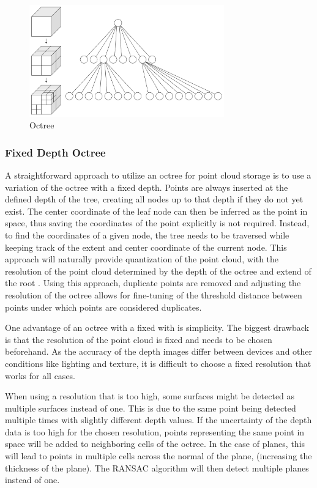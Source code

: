 \begin{figure}[h]
    \centering
    \includegraphics[width=0.75\textwidth]{images/octree}
    \caption{Octree}
    \label{fig:octrree}
\end{figure}

\subsubsection{Fixed Depth Octree}
A straightforward approach to utilize an octree for point cloud storage is to use a variation of the octree with a fixed depth.
Points are always inserted at the defined depth of the tree, creating all nodes up to that depth if they do not yet exist.
The center coordinate of the leaf node can then be inferred as the point in space,
thus saving the coordinates of the point explicitly is not required.
Instead, to find the coordinates of a given node, the tree needs to be traversed while keeping track of
the extent and center coordinate of the current node.
This approach will naturally provide quantization of the point cloud, with the resolution of the point cloud
determined by the depth of the octree and extend of the root .
Using this approach, duplicate points are removed and adjusting the resolution of the octree
allows for fine-tuning of the threshold distance between points under which points are considered duplicates.

One advantage of an octree with a fixed with is simplicity.
The biggest drawback is that the resolution of the point cloud is fixed and needs to be chosen beforehand.
As the accuracy of the depth images differ between devices and other conditions like lighting and texture,
it is difficult to choose a fixed resolution that works for all cases.

When using a resolution that is too high, some surfaces might be detected as multiple surfaces instead of one.
This is due to the same point being detected multiple times with slightly different depth values.
If the uncertainty of the depth data is too high for the chosen resolution,
points representing the same point in space will be added to neighboring cells of the octree.
In the case of planes, this will lead to points in multiple cells across the normal of the plane,
(increasing the thickness of the plane).
The RANSAC algorithm will then detect multiple planes instead of one.

